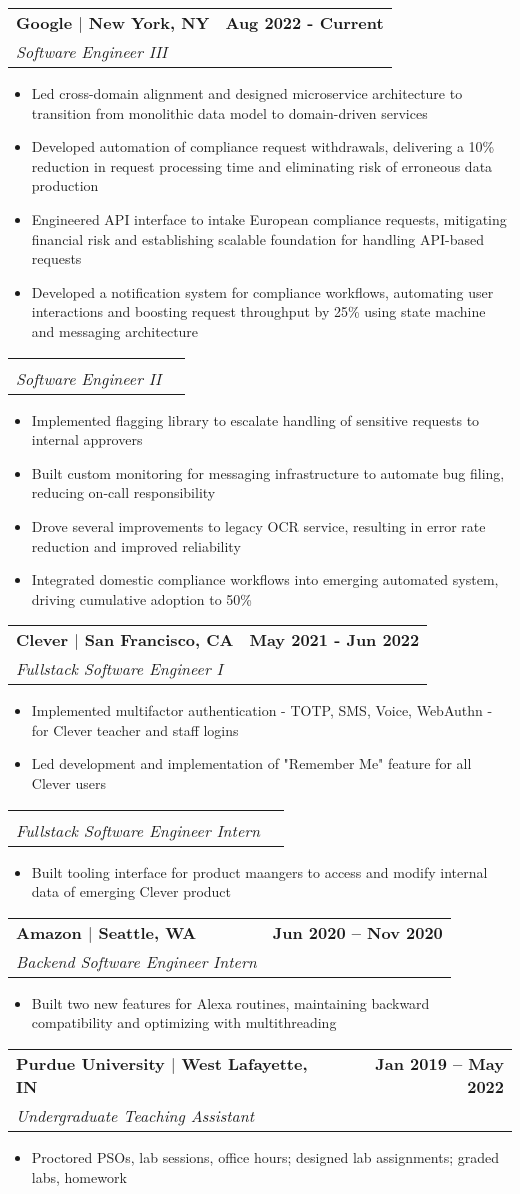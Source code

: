 \documentclass[letterpaper,11pt]{article}
\makeatletter
\newcommand{\resumeItem}[1]{
  \item\small{
    {#1 \vspace{-2pt}}
  }
}
\newcommand{\resumeSubheading}[4]{
  \vspace{-2pt}\item
    \begin{tabular*}{1.0\textwidth}[t]{l@{\extracolsep{\fill}}r}
      \textbf{#1} & \textbf{\small #2} \\
      \textit{\small#3} & \textit{\small #4} \\
    \end{tabular*}\vspace{-7pt}
}
\newcommand{\resumeItemListStart}{\begin{itemize}}
\newcommand{\resumeItemListEnd}{\end{itemize}\vspace{-5pt}}
\makeatother
\begin{document}
    \resumeSubheading
      {Google $|$ New York, NY}{Aug 2022 - Current}
      {Software Engineer III}{}
      \resumeItemListStart
        \resumeItem{Led cross-domain alignment and designed microservice architecture to transition from monolithic data model to domain-driven services}
        \resumeItem{Developed automation of compliance request withdrawals, delivering a 10\% reduction in request processing time and eliminating risk of erroneous data production}
        \resumeItem{Engineered API interface to intake European compliance requests, mitigating financial risk and establishing scalable foundation for handling API-based requests}
        \resumeItem{Developed a notification system for compliance workflows, automating user interactions and boosting request throughput by 25\% using state machine and messaging architecture}
      \resumeItemListEnd
    \vspace{-20pt}
    \resumeSubheading
      {}{}
      {Software Engineer II}{}
      \resumeItemListStart
        \resumeItem{Implemented flagging library to escalate handling of sensitive requests to internal approvers}
        \resumeItem{Built custom monitoring for messaging infrastructure to automate bug filing, reducing on-call responsibility}
        \resumeItem{Drove several improvements to legacy OCR service, resulting in error rate reduction and improved reliability}
        \resumeItem{Integrated domestic compliance workflows into emerging automated system, driving cumulative adoption to 50\%}
      \resumeItemListEnd
      
    \resumeSubheading
      {Clever $|$ San Francisco, CA}{May 2021 - Jun 2022}
      {Fullstack Software Engineer I}{}
      \resumeItemListStart
        \resumeItem{Implemented multifactor authentication - TOTP, SMS, Voice, WebAuthn - for Clever teacher and staff logins}
        \resumeItem{Led development and implementation of "Remember Me" feature for all Clever users}
     \resumeItemListEnd
     \vspace{-15pt}
     \resumeSubheading
      {}{}
      {Fullstack Software Engineer Intern}{}
     \resumeItemListStart
        \resumeItem{Built tooling interface for product maangers to access and modify internal data of emerging Clever product}
    \resumeItemListEnd
    

    \resumeSubheading
      {Amazon $|$ Seattle, WA}{Jun 2020 -- Nov 2020}
      {Backend Software Engineer Intern}{}
    \resumeItemListStart
        \resumeItem{Built two new features for Alexa routines, maintaining backward compatibility and optimizing with multithreading}
    \resumeItemListEnd
    \resumeSubheading
      {Purdue University $|$ West Lafayette, IN}{Jan 2019 -- May 2022}
      {Undergraduate Teaching Assistant}{}
    \resumeItemListStart
        \resumeItem{Proctored PSOs, lab sessions, office hours; designed lab assignments; graded labs, homework}
    \resumeItemListEnd
    
\end{document}
